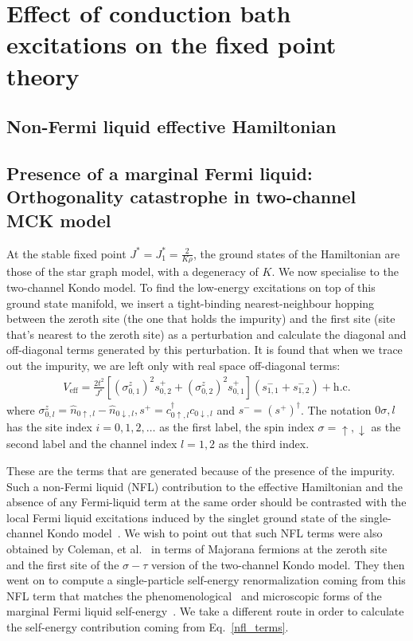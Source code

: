 \documentclass[reprint,prb,superscriptaddress]{revtex4-2}
\begin{document}
\section{Effect of conduction bath excitations on the fixed point theory}
\subsection{Non-Fermi liquid effective Hamiltonian}

\subsection{Presence of a marginal Fermi liquid: Orthogonality catastrophe in two-channel MCK model}
At the stable fixed point \(J ^* = J_1^* = \frac{2}{K \rho}\), the ground states of the Hamiltonian are those of the star graph model, with a degeneracy of \(K\). We now specialise to the two-channel Kondo model. To find the low-energy excitations on top of this ground state manifold, we insert a tight-binding nearest-neighbour hopping between the zeroth site (the one that holds the impurity) and the first site (site that's nearest to the zeroth site) as a perturbation and calculate the diagonal and off-diagonal terms generated by this perturbation. It is found that when we trace out the impurity, we are left only with real space off-diagonal terms:
\begin{equation}\begin{aligned}
	\label{nfl_terms}
	V_\text{eff} = \frac{2t^2}{J^*}\left[\left(\sigma^z_{0,1}\right)^2 s^+_{0,2} + \left(\sigma^z_{0,2}\right)^2 s^+_{0,1}\right] \left(s^-_{1,1} + s^-_{1,2}\right) + \text{h.c.}
\end{aligned}\end{equation}
where \(\sigma^z_{0,l} = \hat n_{0\uparrow,l} - \hat n_{0\downarrow,l}, s^+ = c^\dagger_{0 \uparrow,l}c_{0 \downarrow,l}\) and \(s^- = \left(s^+\right)^\dagger\). The notation \(0\sigma,l\) has the site index \(i=0,1,2,\ldots\) as the first label, the spin index \(\sigma=\uparrow,\downarrow\) as the second label and the channel index \(l=1,2\) as the third index.

These are the terms that are generated because of the presence of the impurity. Such a non-Fermi liquid (NFL) contribution to the effective Hamiltonian and the absence of any Fermi-liquid term at the same order should be contrasted with the local Fermi liquid excitations induced by the singlet ground state of the single-channel Kondo model~\cite{nozieres1974fermi,wilson1975renormalization,hewson1993}. We wish to point out that such NFL terms were also obtained by Coleman, et al.~\cite{Coleman_tsvelik} in terms of Majorana fermions at the zeroth site and the first site of the \(\sigma-\tau\) version of the two-channel Kondo model. They then went on to compute a single-particle self-energy renormalization coming from this NFL term that matches the phenomenological~\cite{varma2002singular} and microscopic forms of the marginal Fermi liquid self-energy~\cite{anirbanmott1,anirbanurg1}. We take a different route in order to calculate the self-energy contribution coming from Eq.~\ref{nfl_terms}.
\end{document}
